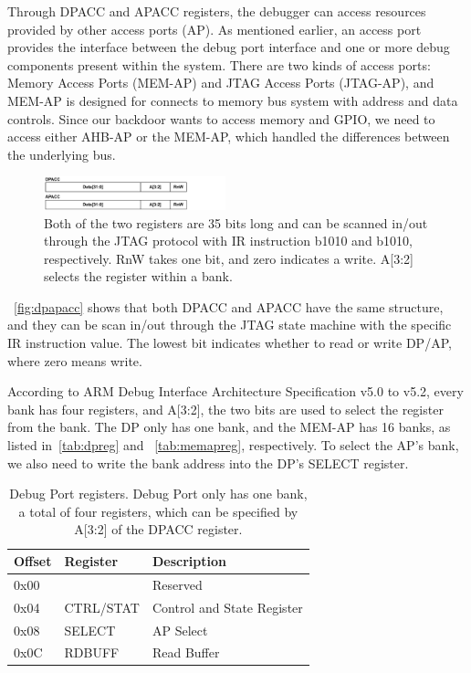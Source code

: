 Through DPACC and APACC registers, the debugger can access resources provided by other access ports (AP).  As mentioned earlier, an access port provides the interface between the debug port interface and one or more debug components present within the system. There are two kinds of access ports: Memory Access Ports (MEM-AP) and JTAG Access Ports (JTAG-AP), and MEM-AP is designed for connects to memory bus system with address and data controls.  Since our backdoor wants to access memory and GPIO, we need to access either AHB-AP or the MEM-AP, which handled the differences between the underlying bus.



\begin{figure}[ht]
	\includegraphics[width=0.47\textwidth]{figures/dpapacc}
	\centering
	\caption{Both of the two registers are 35 bits long and can be scanned in/out through the JTAG protocol with IR instruction b1010 and b1010, respectively. RnW takes one bit, and zero indicates a write. A[3:2] selects the register within a bank.}
	\label{fig:dpapacc}
\end{figure}


~\autoref{fig:dpapacc} shows that both DPACC and APACC have the same structure, and they can be scan in/out through the JTAG state machine with the specific IR instruction value. The lowest bit indicates whether to read or write DP/AP, where zero means write.

 According to ARM Debug Interface Architecture Specification v5.0 to v5.2, every bank has four registers, and A[3:2], the two bits are used to select the register from the bank. The DP only has one bank, and the MEM-AP has 16 banks, as listed in~\autoref{tab:dpreg} and ~\autoref{tab:memapreg}, respectively. To select the AP's bank, we also need to write the bank address into the DP's SELECT register.




\begin{center}
	\begin{table}
		\small
		\begin{tabular}{l l l} 
			\hline
			Offset & Register &  Description  \\ 
			\hline
			0x00 & & Reserved \\
			\hline
			0x04 & CTRL/STAT & Control and State Register \\
			\hline
			0x08 & SELECT & AP Select \\
			\hline
			0x0C & RDBUFF & Read Buffer\\
			\hline
		\end{tabular}
		\caption{Debug Port registers. Debug Port only has one bank, a total of four registers, which can be specified by A[3:2] of the DPACC register. }
		\label{tab:dpreg}
	\end{table}
\end{center}

